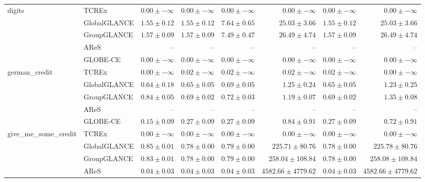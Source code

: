 \begin{table}[ht]
\begin{center}
\begin{sc}
\begin{scriptsize}
\begin{tabular}{l|l|rrrrrr}
\midrule
\multirow{5}{*}{digits} & TCREx & $\boldsymbol{0.00\pm{-\infty}}$ & $\boldsymbol{0.00\pm{-\infty}}$ & $\boldsymbol{0.00\pm{-\infty}}$ & $\boldsymbol{0.00\pm{-\infty}}$ & $\boldsymbol{0.00\pm{-\infty}}$ & $\boldsymbol{0.00\pm{-\infty}}$ \\
 & GlobalGLANCE & $1.55\pm{0.12}$ & $1.55\pm{0.12}$ & $7.64\pm{0.65}$ & $25.03\pm{3.66}$ & $1.55\pm{0.12}$ & $25.03\pm{3.66}$ \\
 & GroupGLANCE & $1.57\pm{0.09}$ & $1.57\pm{0.09}$ & $7.49\pm{0.47}$ & $26.49\pm{4.74}$ & $1.57\pm{0.09}$ & $26.49\pm{4.74}$ \\
 & AReS & -- & -- & -- & -- & -- & -- \\
 & GLOBE-CE & $\boldsymbol{0.00\pm{-\infty}}$ & $\boldsymbol{0.00\pm{-\infty}}$ & $\boldsymbol{0.00\pm{-\infty}}$ & $\boldsymbol{0.00\pm{-\infty}}$ & $\boldsymbol{0.00\pm{-\infty}}$ & $\boldsymbol{0.00\pm{-\infty}}$ \\
\midrule
\multirow{5}{*}{german\_credit} & TCREx & $\boldsymbol{0.00\pm{-\infty}}$ & $\boldsymbol{0.02\pm{-\infty}}$ & $\boldsymbol{0.02\pm{-\infty}}$ & $\boldsymbol{0.02\pm{-\infty}}$ & $\boldsymbol{0.02\pm{-\infty}}$ & $\boldsymbol{0.00\pm{-\infty}}$ \\
 & GlobalGLANCE & $0.64\pm{0.18}$ & $0.65\pm{0.05}$ & $0.69\pm{0.05}$ & $1.25\pm{0.24}$ & $0.65\pm{0.05}$ & $1.23\pm{0.25}$ \\
 & GroupGLANCE & $0.84\pm{0.05}$ & $0.69\pm{0.02}$ & $0.72\pm{0.03}$ & $1.19\pm{0.07}$ & $0.69\pm{0.02}$ & $1.35\pm{0.08}$ \\
 & AReS & -- & -- & -- & -- & -- & -- \\
 & GLOBE-CE & $0.15\pm{0.09}$ & $0.27\pm{0.09}$ & $0.27\pm{0.09}$ & $0.84\pm{0.91}$ & $0.27\pm{0.09}$ & $0.72\pm{0.91}$ \\
\midrule
\multirow{5}{*}{give\_me\_some\_credit} & TCREx & $\boldsymbol{0.00\pm{-\infty}}$ & $\boldsymbol{0.00\pm{-\infty}}$ & $\boldsymbol{0.00\pm{-\infty}}$ & $\boldsymbol{0.00\pm{-\infty}}$ & $\boldsymbol{0.00\pm{-\infty}}$ & $\boldsymbol{0.00\pm{-\infty}}$ \\
 & GlobalGLANCE & $0.85\pm{0.01}$ & $0.78\pm{0.00}$ & $0.79\pm{0.00}$ & $225.71\pm{80.76}$ & $0.78\pm{0.00}$ & $225.78\pm{80.76}$ \\
 & GroupGLANCE & $0.83\pm{0.01}$ & $0.78\pm{0.00}$ & $0.79\pm{0.00}$ & $258.04\pm{108.84}$ & $0.78\pm{0.00}$ & $258.08\pm{108.84}$ \\
 & AReS & $0.04\pm{0.03}$ & $0.04\pm{0.03}$ & $0.04\pm{0.03}$ & $4582.66\pm{4779.62}$ & $0.04\pm{0.03}$ & $4582.66\pm{4779.62}$ \\

\end{tabular}
\end{scriptsize}
\end{sc}
\end{center}
\end{table}
